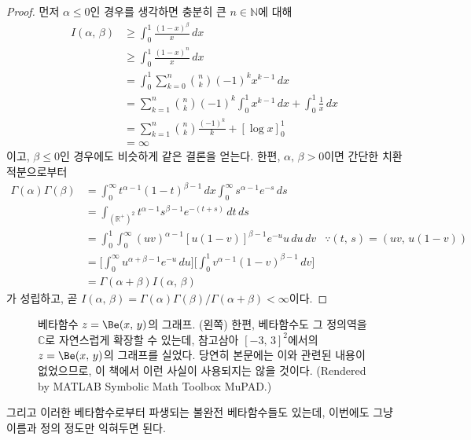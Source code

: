 \begin{proof}
    먼저 $\alpha\leq0$인 경우를 생각하면 충분히 큰 $n\in\mathbb{N}$에 대해
    \begin{align*}
        I(\alpha,\,\beta)&\geq\int_0^1\frac{(1-x)^\beta}{x}\,dx\\
        &\geq\int_0^1\frac{(1-x)^n}{x}\,dx\\
        &=\int_0^1\sum_{k=0}^n\binom{n}{k}(-1)^kx^{k-1}\,dx\\
        &=\sum_{k=1}^n\binom{n}{k}(-1)^k\int_0^1x^{k-1}\,dx+\int_0^1\frac{1}{x}\,dx\\
        &=\sum_{k=1}^n\binom{n}{k}\frac{(-1)^k}{k}+[\log x]_0^1\\
        &=\infty
    \end{align*}
    이고, $\beta\leq0$인 경우에도 비슷하게 같은 결론을 얻는다. 한편, $\alpha,\,\beta>0$이면 간단한 치환적분으로부터
    \begin{align*}
        \Gamma(\alpha)\Gamma(\beta)&=\int_0^\infty t^{\alpha-1}(1-t)^{\beta-1}\,dx\int_0^\infty s^{\alpha-1}e^{-s}\,ds\\
        &=\int_{(\mathbb{R}^+)^2}t^{\alpha-1}s^{\beta-1}e^{-(t+s)}\,dt\,ds\\
        &=\int_0^1\int_0^\infty(uv)^{\alpha-1}[u(1-v)]^{\beta-1}e^{-u}u\,du\,dv&\because(t,\,s)=(uv,\,u(1-v))\\
        &=\bigg[\int_0^\infty u^{\alpha+\beta-1}e^{-u}\,du\bigg]\bigg[\int_0^1v^{\alpha-1}(1-v)^{\beta-1}\,dv\bigg]\\
        &=\Gamma(\alpha+\beta)I(\alpha,\,\beta)
    \end{align*}
    가 성립하고, 곧 $I(\alpha,\,\beta)=\Gamma(\alpha)\Gamma(\beta)/\Gamma(\alpha+\beta)<\infty$이다.
\end{proof}

\begin{figure}[!ht]
    \centering
    \caption{베타함수 $z=\Be(x,\,y)$의 그래프. (왼쪽) 한편, 베타함수도 그 정의역을 $\mathbb{C}$로 자연스럽게 확장할 수 있는데, 참고삼아 $[-3,\,3]^2$에서의 $z=\Be(x,\,y)$의 그래프를 실었다. 당연히 본문에는 이와 관련된 내용이 없었으므로, 이 책에서 이런 사실이 사용되지는 않을 것이다. (Rendered by MATLAB Symbolic Math Toolbox MuPAD.)}
\end{figure}

그리고 이러한 베타함수로부터 파생되는 불완전 베타함수들도 있는데, 이번에도 그냥 이름과 정의 정도만 익혀두면 된다.

